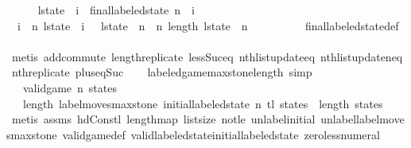 \begin{isabellebody}
\ \ \ \ \isamarkupfalse%
\ {\isachardoublequoteopen}l{\isacharunderscore}state\ {\isacharbang}\ i\ {\isacharequal}\ final{\isacharunderscore}labeled{\isacharunderscore}state\ n\ {\isacharbang}\ i{\isachardoublequoteclose}\isanewline
\ \ \ \ \ \ \isamarkupfalse%
\ {\isacharbackquoteopen}{\isasymforall}\ i\ {\isacharless}\ n{\isachardot}\ l{\isacharunderscore}state\ {\isacharbang}\ i\ {\isacharequal}\ {\isacharbraceleft}{\isacharbraceright}{\isacharbackquoteclose}\ {\isacharbackquoteopen}l{\isacharunderscore}state\ {\isacharbang}\ n\ {\isacharequal}\ {\isacharbraceleft}{}{\isachardot}{\isachardot}{\isacharless}n{\isacharbraceright}{\isacharbackquoteclose}\ {\isacharbackquoteopen}length\ l{\isacharunderscore}state\ {\isacharequal}\ n\ {\isacharplus}\ {}{\isacharbackquoteclose}\isanewline
\ \ \ \ \ \ \isamarkupfalse%
\ final{\isacharunderscore}labeled{\isacharunderscore}state{\isacharunderscore}def\isanewline
\ \ \ \ \ \ \isamarkupfalse%
\ {\isacharparenleft}metis\ add{\isachardot}commute\ length{\isacharunderscore}replicate\ less{\isacharunderscore}Suc{\isacharunderscore}eq\ nth{\isacharunderscore}list{\isacharunderscore}update{\isacharunderscore}eq\ nth{\isacharunderscore}list{\isacharunderscore}update{\isacharunderscore}neq\ nth{\isacharunderscore}replicate\ plus{\isacharunderscore}{}{\isacharunderscore}eq{\isacharunderscore}Suc{\isacharparenright}\isanewline
\ \ \isamarkupfalse%
\isanewline
{}\isamarkupfalse%
%
\endisatagproof
{\isafoldproof}%
%
\isadelimproof
\isanewline
%
\endisadelimproof
\isanewline
{}\isamarkupfalse%
\ labeled{\isacharunderscore}game{\isacharunderscore}max{\isacharunderscore}stone{\isacharunderscore}length\ {\isacharbrackleft}simp{\isacharbrackright}{\isacharcolon}\isanewline
\ \ \ {\isachardoublequoteopen}valid{\isacharunderscore}game\ n\ states{\isachardoublequoteclose}\isanewline
\ \ \ {\isachardoublequoteopen}length\ {\isacharparenleft}label{\isacharunderscore}moves{\isacharunderscore}max{\isacharunderscore}stone\ {\isacharparenleft}initial{\isacharunderscore}labeled{\isacharunderscore}state\ n{\isacharparenright}\ {\isacharparenleft}tl\ states{\isacharparenright}{\isacharparenright}\ {\isacharequal}\ length\ states{\isachardoublequoteclose}\isanewline
%
\isadelimproof
\ \ %
\endisadelimproof
%
\isatagproof
{}\isamarkupfalse%
\ {\isacharparenleft}metis\ assms\ hd{\isacharunderscore}Cons{\isacharunderscore}tl\ length{\isacharunderscore}map\ list{\isachardot}size{\isacharparenleft}{}{\isacharparenright}\ not{\isacharunderscore}le\ unlabel{\isacharunderscore}initial\ unlabel{\isacharunderscore}label{\isacharunderscore}moves{\isacharunderscore}max{\isacharunderscore}stone\ valid{\isacharunderscore}game{\isacharunderscore}def\ valid{\isacharunderscore}labeled{\isacharunderscore}state{\isacharunderscore}initial{\isacharunderscore}labeled{\isacharunderscore}state\ zero{\isacharunderscore}less{\isacharunderscore}numeral{\isacharparenright}%

\end{isabellebody}
